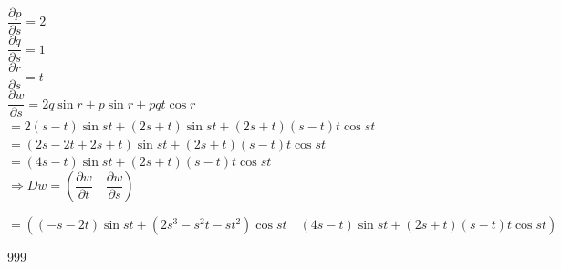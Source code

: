 \documentclass[a4paper]{article}
\begin{document}
$\dfrac{\partial p}{\partial s} = 2$ \\

$\dfrac{\partial q}{\partial s} = 1$ \\

$\dfrac{\partial r}{\partial s} = t$ \\

$\dfrac{\partial w}{\partial s} = 2q\sin r + p\sin r + pqt\cos r $ \\

$= 2(s - t)\sin st + (2s + t)\sin st + (2s + t)(s - t)t\cos st $ \\

$= (2s - 2t + 2s + t)\sin st + (2s + t)(s - t)t\cos st $ \\

$= (4s - t)\sin st + (2s + t)(s - t)t\cos st $ \\

$\Rightarrow Dw = \left(\dfrac{\partial w}{\partial t} \quad \dfrac{\partial w}{\partial s}\right)$

$= \left((-s - 2t)\sin st + (2s^3 - s^2t - st^2)\cos st \quad (4s - t)\sin st + (2s + t)(s - t)t\cos st\right)$















\begin{thebibliography}{999}
\end{thebibliography}
\end{document}
